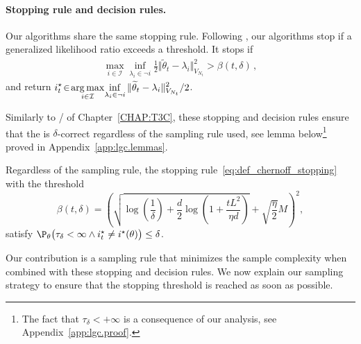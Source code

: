 \paragraph{Stopping rule and decision rules.}
Our algorithms share the same stopping rule. Following \citet{garivier2016tracknstop}, our algorithms stop if a generalized likelihood ratio exceeds a threshold. It stops if
\begin{align}
\label{eq:def_chernoff_stopping}
\max_{i\in \mathcal I} \inf_{\lambda_i \in \neg i}\frac{1}{2}\Vert \tilde{\theta}_t - \lambda_i \Vert^2_{V_{N_t}}
> \beta(t,\delta)\,,
\end{align}
and return {\small $\displaystyle i^\star_t\! \in\! \operatorname*{arg\,max}_{i\in \mathcal I}\! \inf_{\lambda_i \in \neg i}\Vert \widetilde{\theta}_t - \lambda_i \Vert^2_{V_{N_t}}/2$}.


Similarly to \TCC{}/\TTTS{} of Chapter~\ref{CHAP:T3C}, these stopping and decision rules ensure that the \LG{} is $\delta$-correct regardless of the sampling rule used, see lemma below\footnote{The fact that $\tau_\delta <+\infty$ is a consequence of our analysis, see Appendix~\ref{app:lgc.proof}.} proved in Appendix~\ref{app:lgc.lemmas}.

\begin{lemma}
\label{lem:chernoff_stopping rule_pac}
Regardless of the sampling rule, the stopping rule~\eqref{eq:def_chernoff_stopping} with the threshold
{\small\begin{equation} \label{eq:def_beta}
\beta(t,\delta) =\left( \sqrt{\log\!\left( \frac{1}{\delta}\right)+\frac{d}{2}\log\!\left(1+\frac{t L^2}{\eta d} \right)} +\sqrt{\frac{\eta}{2}}M\right)^2\!\!\!,
\end{equation}}
satisfy $ \P_{\theta}\big(\tau_{\delta} < \infty \wedge \istar_t \neq \istar(\theta)\big) \leq \delta$.
\end{lemma}
Our contribution is a sampling rule that minimizes the sample complexity when combined with these stopping and decision rules.
We now explain our sampling strategy to ensure that the stopping threshold is reached as soon as possible.

